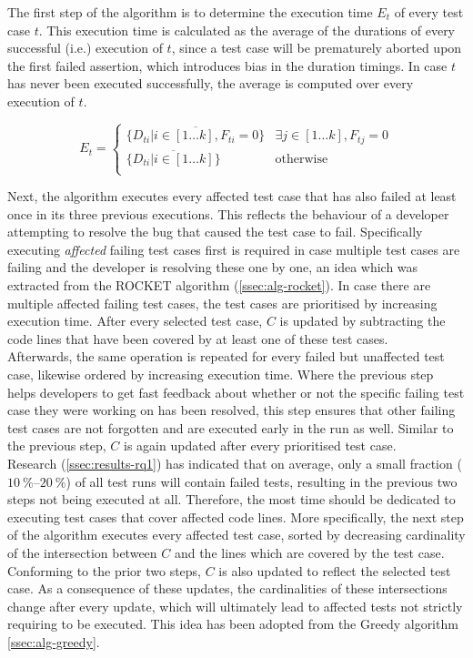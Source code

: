 \noindent The first step of the algorithm is to determine the execution time $E_t$ of every test case $t$. This execution time is calculated as the average of the durations of every successful (i.e.) execution of $t$, since a test case will be prematurely aborted upon the first failed assertion, which introduces bias in the duration timings. In case $t$ has never been executed successfully, the average is computed over every execution of $t$.

\[
	E_t = \left.
	\begin{cases}
		\overline{\{D_{ti} \vert i \in [1 \dots k], F_{ti} = 0\}} & \exists j \in [1 \dots k], F_{tj} = 0 \\
		\overline{\{D_{ti} \vert i \in [1 \dots k]\}} & \text{otherwise} \\
	\end{cases}
	\right.
\]

\noindent Next, the algorithm executes every affected test case that has also failed at least once in its three previous executions. This reflects the behaviour of a developer attempting to resolve the bug that caused the test case to fail. Specifically executing \emph{affected} failing test cases first is required in case multiple test cases are failing and the developer is resolving these one by one, an idea which was extracted from the ROCKET algorithm (\autoref{ssec:alg-rocket}). In case there are multiple affected failing test cases, the test cases are prioritised by increasing execution time. After every selected test case, $C$ is updated by subtracting the code lines that have been covered by at least one of these test cases.\\

\noindent Afterwards, the same operation is repeated for every failed but unaffected test case, likewise ordered by increasing execution time. Where the previous step helps developers to get fast feedback about whether or not the specific failing test case they were working on has been resolved, this step ensures that other failing test cases are not forgotten and are executed early in the run as well. Similar to the previous step, $C$ is again updated after every prioritised test case.\\

\noindent Research (\autoref{ssec:results-rq1}) has indicated that on average, only a small fraction ($\SIrange{10}{20}{\percent}$) of all test runs will contain failed tests, resulting in the previous two steps not being executed at all. Therefore, the most time should be dedicated to executing test cases that cover affected code lines. More specifically, the next step of the algorithm executes every affected test case, sorted by decreasing cardinality of the intersection between $C$ and the lines which are covered by the test case. Conforming to the prior two steps, $C$ is also updated to reflect the selected test case. As a consequence of these updates, the cardinalities of these intersections change after every update, which will ultimately lead to affected tests not strictly requiring to be executed. This idea has been adopted from the Greedy algorithm \autoref{ssec:alg-greedy}.\\

